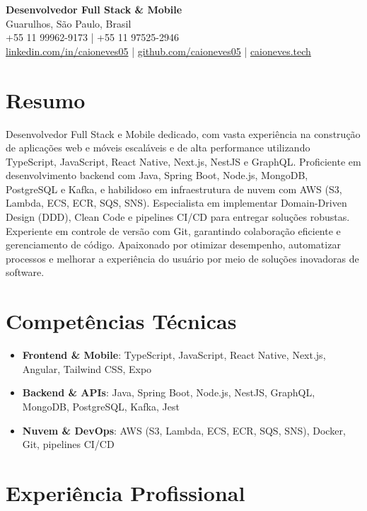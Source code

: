 \documentclass[11pt,letterpaper]{article}
\begin{document}
\begin{center}
    \textbf{\Large Desenvolvedor Full Stack \& Mobile} \\
    \vspace{5pt}
    Guarulhos, São Paulo, Brasil \\
    +55 11 99962-9173 | +55 11 97525-2946 \\
    \href{https://www.linkedin.com/in/caioneves05}{linkedin.com/in/caioneves05} |
    \href{https://github.com/caioneves05}{github.com/caioneves05} |
    \href{http://caioneves.tech}{caioneves.tech}
\end{center}

\section{Resumo}
Desenvolvedor Full Stack e Mobile dedicado, com vasta experiência na construção de aplicações web e móveis escaláveis e de alta performance utilizando TypeScript, JavaScript, React Native, Next.js, NestJS e GraphQL. Proficiente em desenvolvimento backend com Java, Spring Boot, Node.js, MongoDB, PostgreSQL e Kafka, e habilidoso em infraestrutura de nuvem com AWS (S3, Lambda, ECS, ECR, SQS, SNS). Especialista em implementar Domain-Driven Design (DDD), Clean Code e pipelines CI/CD para entregar soluções robustas. Experiente em controle de versão com Git, garantindo colaboração eficiente e gerenciamento de código. Apaixonado por otimizar desempenho, automatizar processos e melhorar a experiência do usuário por meio de soluções inovadoras de software.

\section{Competências Técnicas}
\begin{itemize}[leftmargin=*]
    \item \textbf{Frontend \& Mobile}: TypeScript, JavaScript, React Native, Next.js, Angular, Tailwind CSS, Expo
    \item \textbf{Backend \& APIs}: Java, Spring Boot, Node.js, NestJS, GraphQL, MongoDB, PostgreSQL, Kafka, Jest
    \item \textbf{Nuvem \& DevOps}: AWS (S3, Lambda, ECS, ECR, SQS, SNS), Docker, Git, pipelines CI/CD
\end{itemize}

\section{Experiência Profissional}
\end{document}
